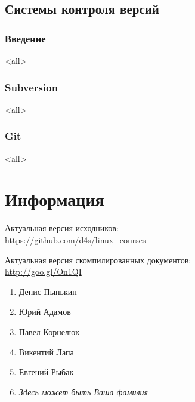 \chapter{Системы контроля версий}
\section{Введение}
\mode<all>{}
\section[SVN]{Subversion}
\mode<all>{}
\section{Git}
\mode<all>{}

\part*{Информация}

Актуальная версия исходников:\\
\url{https://github.com/d4s/linux_courses}

Актуальная версия скомпилированных документов:\\
\url{http://goo.gl/On1QI}

\bigskip

\begin{enumerate}
		\item Денис Пынькин
		\item Юрий Адамов
		\item Павел Корнелюк
		\item Викентий Лапа
		\item Евгений Рыбак
		\item {\it Здесь может быть Ваша фамилия}
\end{enumerate}


